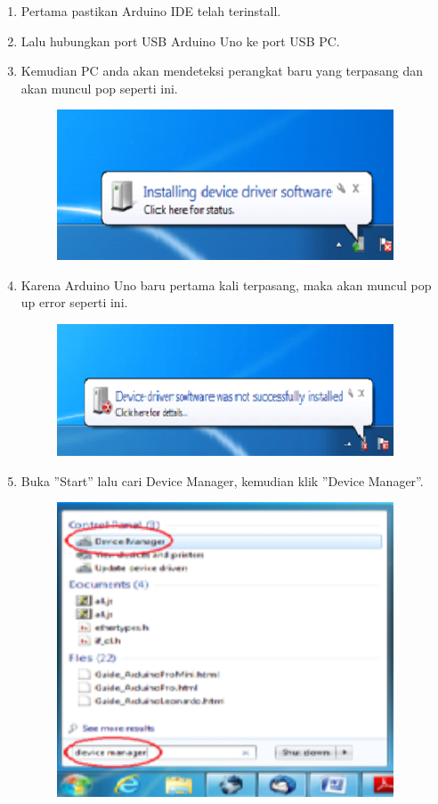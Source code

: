 \begin{enumerate}
	\item Pertama pastikan Arduino IDE telah terinstall.
	\item Lalu hubungkan port USB Arduino Uno ke port USB PC.
	\item Kemudian PC anda akan mendeteksi perangkat baru yang terpasang dan akan muncul pop seperti ini.
	\begin{figure}[H]
		\includegraphics[width=10cm]{figures/5/1174006/Teori/1.png}
		\centering
	\end{figure}
	\item Karena Arduino Uno baru pertama kali terpasang, maka akan muncul pop up error seperti ini.
	\begin{figure}[H]
		\includegraphics[width=10cm]{figures/5/1174006/Teori/2.png}
		\centering
	\end{figure}
	\item Buka ''Start'' lalu cari Device Manager, kemudian klik ''Device Manager''.
	\begin{figure}[H]
		\includegraphics[width=10cm]{figures/5/1174006/Teori/3.png}

\end{figure}
\end{enumerate}
